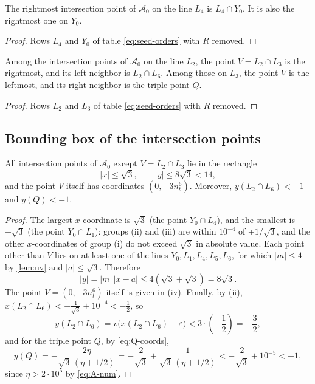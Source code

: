 \begin{corollary}\label{cor:rightmost-L4}
The rightmost intersection point of $\mathcal A_0$ on the line $L_4$ is $L_4\cap Y_0$. It is also the rightmost one on $Y_0$.
\end{corollary}

\begin{proof}
Rows $L_4$ and $Y_0$ of table \eqref{eq:seed-orders} with $R$ removed.
\end{proof}

\begin{corollary}\label{cor:rightmost-L2}
Among the intersection points of $\mathcal A_0$ on the line $L_2$, the point $V=L_2\cap L_3$ is the rightmost, and its left neighbor is $L_2\cap L_6$.
Among those on $L_3$, the point $V$ is the leftmost, and its right neighbor is the triple point $Q$.
\end{corollary}

\begin{proof}
Rows $L_2$ and $L_3$ of table \eqref{eq:seed-orders} with $R$ removed.
\end{proof}

\subsection{Bounding box of the intersection points}

\begin{lemma}\label{lem:seed-box}
All intersection points of $\mathcal A_0$ except $V=L_2\cap L_3$ lie in the rectangle
\[
|x|\le\sqrt3,
\qquad
|y|\le8\sqrt3<14 ,
\]
and the point $V$ itself has coordinates $(0,-3n_t^6)$. Moreover, $y(L_2\cap L_6)<-1$ and $y(Q)<-1$.
\end{lemma}

\begin{proof}
The largest $x$-coordinate is $\sqrt3$ (the point $Y_0\cap L_4$), and the smallest is $-\sqrt3$ (the point $Y_0\cap L_1$): groups (ii) and (iii) are within $10^{-4}$ of $\mp1/\sqrt3$, and the other $x$-coordinates of group (i) do not exceed $\sqrt3$ in absolute value.
Each point other than $V$ lies on at least one of the lines $Y_0,L_1,L_4,L_5,L_6$, for which $|m|\le4$ by \cref{lem:uv} and $|a|\le\sqrt3$. Therefore
\[
|y|=|m|\,|x-a|\le4\left(\sqrt3+\sqrt3\right)=8\sqrt3 .
\]
The point $V=(0,-3n_t^6)$ itself is given in (iv).
Finally, by (ii), $x(L_2\cap L_6)<-\tfrac1{\sqrt3}+10^{-4}<-\tfrac12$, so
\[
y(L_2\cap L_6)=v\bigl(x(L_2\cap L_6)-\varepsilon\bigr)<3\cdot\left(-\frac12\right)=-\frac32 ,
\]
and for the triple point $Q$, by \eqref{eq:Q-coords},
\[
y(Q)=-\frac{2\eta}{\sqrt3\,(\eta+1/2)}
=-\frac2{\sqrt3}+\frac1{\sqrt3\,(\eta+1/2)}
<-\frac2{\sqrt3}+10^{-5}<-1 ,
\]
since $\eta>2\cdot10^5$ by \eqref{eq:A-num}.
\end{proof}

